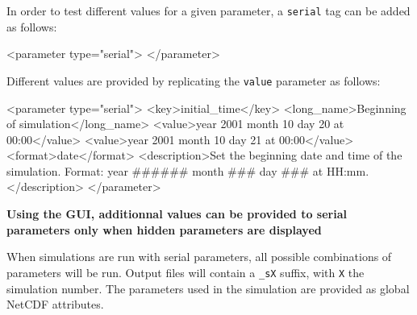 \documentclass[
  letterpaper,
  DIV=11,
  numbers=noendperiod]{scrreprt}
\newenvironment{Shaded}{\begin{snugshade}}{\end{snugshade}}
\newcommand{\KeywordTok}[1]{\textcolor[rgb]{0.00,0.23,0.31}{#1}}
\newcommand{\NormalTok}[1]{\textcolor[rgb]{0.00,0.23,0.31}{#1}}
\newcommand{\OtherTok}[1]{\textcolor[rgb]{0.00,0.23,0.31}{#1}}
\newcommand{\StringTok}[1]{\textcolor[rgb]{0.13,0.47,0.30}{#1}}
\begin{document}
In order to test different values for a given parameter, a
\texttt{serial} tag can be added as follows:

\begin{Shaded}
\begin{Highlighting}[]
\NormalTok{\textless{}}\KeywordTok{parameter}\OtherTok{ type=}\StringTok{"serial"}\NormalTok{\textgreater{}}
\NormalTok{\textless{}/}\KeywordTok{parameter}\NormalTok{\textgreater{}}
\end{Highlighting}
\end{Shaded}

Different values are provided by replicating the \texttt{value}
parameter as follows:

\begin{Shaded}
\begin{Highlighting}[]
\NormalTok{\textless{}}\KeywordTok{parameter}\OtherTok{ type=}\StringTok{"serial"}\NormalTok{\textgreater{}}
\NormalTok{  \textless{}}\KeywordTok{key}\NormalTok{\textgreater{}initial\_time\textless{}/}\KeywordTok{key}\NormalTok{\textgreater{}}
\NormalTok{  \textless{}}\KeywordTok{long\_name}\NormalTok{\textgreater{}Beginning of simulation\textless{}/}\KeywordTok{long\_name}\NormalTok{\textgreater{}}
\NormalTok{  \textless{}}\KeywordTok{value}\NormalTok{\textgreater{}year 2001 month 10 day 20 at 00:00\textless{}/}\KeywordTok{value}\NormalTok{\textgreater{}}
\NormalTok{  \textless{}}\KeywordTok{value}\NormalTok{\textgreater{}year 2001 month 10 day 21 at 00:00\textless{}/}\KeywordTok{value}\NormalTok{\textgreater{}}
\NormalTok{  \textless{}}\KeywordTok{format}\NormalTok{\textgreater{}date\textless{}/}\KeywordTok{format}\NormalTok{\textgreater{}}
\NormalTok{  \textless{}}\KeywordTok{description}\NormalTok{\textgreater{}Set the beginning date and time of the simulation. Format: year \#\#\#\#\#\# month \#\#\# day \#\#\# at HH:mm.\textless{}/}\KeywordTok{description}\NormalTok{\textgreater{}}
\NormalTok{\textless{}/}\KeywordTok{parameter}\NormalTok{\textgreater{}}
\end{Highlighting}
\end{Shaded}

\textbf{Using the GUI, additionnal values can be provided to serial
parameters only when hidden parameters are displayed}

When simulations are run with serial parameters, all possible
combinations of parameters will be run. Output files will contain a
\texttt{\_sX} suffix, with \texttt{X} the simulation number. The
parameters used in the simulation are provided as global NetCDF
attributes.
\end{document}
